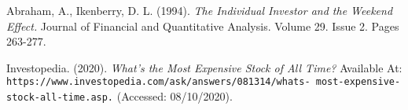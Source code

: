 \documentclass[11pt, english]{article}
\begin{document}
\newpage

	\renewcommand\refname{Bibliography}

	\fancyhead[L]{\leftmark}

	\begin{thebibliography}{9}

		Abraham, A., Ikenberry, D. L. (1994).
		\textsl{The Individual Investor and the Weekend Effect.}
		Journal of Financial and Quantitative Analysis. Volume 29. Issue 2. Pages 263-277.
	
		Investopedia. (2020).
		\textsl{What’s the Most Expensive Stock of All Time?}
		Available At:
		\texttt{https://www.investopedia.com/ask/answers/081314/whats- most-expensive-stock-all-time.asp.}
		(Accessed: 08/10/2020).

	\end{thebibliography}
\end{document}
